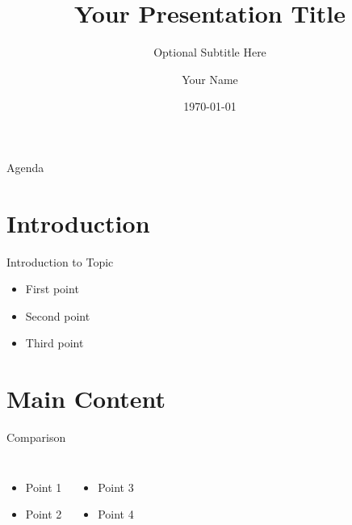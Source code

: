 \documentclass{beamer}
\title[Short Title]{Your Presentation Title}
\subtitle{Optional Subtitle Here}
\author{Your Name}
\institute{Your Institute or Organization}
\date{\today} %
\begin{document}
\begin{frame}
    \titlepage{}
\end{frame}

\begin{frame}{Agenda}  %
    \tableofcontents{}
\end{frame}

\section{Introduction}

\begin{frame}{Introduction to Topic}
    \begin{itemize}
        \item{First point}
        \item{Second point}
        \item{Third point}
    \end{itemize}
\end{frame}


\section{Main Content}

\begin{frame}{Comparison}
    \begin{columns}
        \begin{itemize}
            \item{Point 1}
            \item{Point 2}
        \end{itemize}

        \begin{itemize}
            \item{Point 3}
            \item{Point 4}
        \end{itemize}
    \end{columns}
\end{frame}
\end{document}
